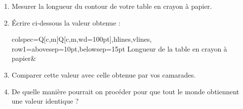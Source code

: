 \documentclass[activite]{thedocument}
\begin{document}
    \begin{enumerate}
        \item Mesurer la longueur du contour de votre table en crayon à papier.
        \item Écrire ci-dessous la valeur obtenue :\medskip\par
        \begin{tblr}{
                colspec={Q[c,m]Q[c,m,wd=100pt]},hlines,vlines,
                row{1}={abovesep=10pt,belowsep=15pt}%
            }
            Longueur de la table en crayon à papier&\\
        \end{tblr}\medskip
        \item Comparer cette valeur avec celle obtenue par vos camarades.
        \item De quelle manière pourrait on procéder pour que tout le monde
        obtiennent une valeur identique ?
        \dotedline\dotedline\dotedline\dotedline
    \end{enumerate}
\end{document}
